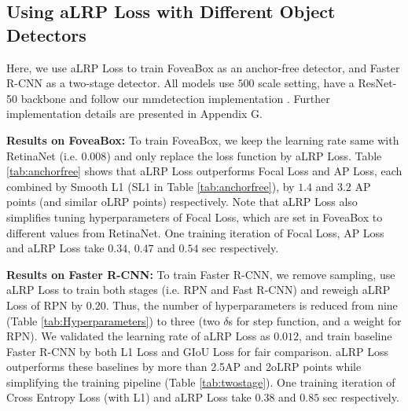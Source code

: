 \documentclass{article}
\begin{document}
\subsection{Using aLRP Loss with Different Object Detectors}
Here, we use aLRP Loss to train FoveaBox \cite{FoveaBox} as an anchor-free detector, and Faster R-CNN \cite{FasterRCNN} as a two-stage detector. All models use $500$ scale setting, have a ResNet-50 backbone and follow our mmdetection implementation \cite{mmdetection}. Further implementation details are presented in Appendix G.



\textbf{Results on FoveaBox:} To train FoveaBox, we keep the learning rate same with RetinaNet (i.e. $0.008$) and only replace the loss function by aLRP Loss. Table \ref{tab:anchorfree} shows that aLRP Loss outperforms Focal Loss and AP Loss, each combined by Smooth L1 (SL1 in Table \ref{tab:anchorfree}), by $1.4$ and $3.2$ AP points (and similar oLRP points) respectively. Note that aLRP Loss also simplifies tuning hyperparameters of Focal Loss, which are set in FoveaBox to different values from RetinaNet. One training iteration of Focal Loss, AP Loss and aLRP Loss take $0.34$, $0.47$ and $0.54$ sec respectively.

\textbf{Results on Faster R-CNN:} To train Faster R-CNN, we remove sampling, use aLRP Loss to train both stages (i.e. RPN and Fast R-CNN) and reweigh aLRP Loss of RPN by $0.20$. Thus, the number of hyperparameters is reduced from nine (Table \ref{tab:Hyperparameters}) to three (two $\delta$s for step function, and a weight for RPN). We validated the learning rate of aLRP Loss as $0.012$, and train baseline Faster R-CNN by both L1 Loss and GIoU Loss for fair comparison. aLRP Loss outperforms these baselines by more than 2.5AP and 2oLRP points while simplifying the training pipeline (Table \ref{tab:twostage}). One training iteration of Cross Entropy Loss (with L1) and aLRP Loss take $0.38$ and $0.85$ sec respectively.
\end{document}
